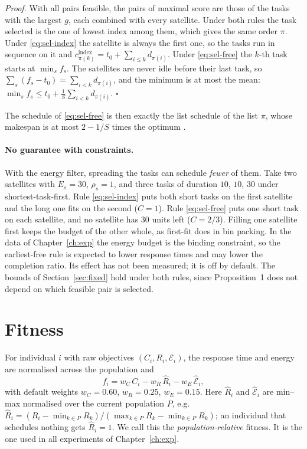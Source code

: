 \emph{Proof.} With all pairs feasible, the pairs of maximal score are those of the
tasks with the largest $g$, each combined with every satellite. Under both rules
the task selected is the one of lowest index among them, which gives the same
order $\pi$. Under \eqref{eq:sel-index} the satellite is always the first one, so
the tasks run in sequence on it and $c^{\mathrm{index}}_{\pi(k)}=t_0+\sum_{i\le k}d_{\pi(i)}$.
Under \eqref{eq:sel-free} the $k$-th task starts at $\min_s f_s$. The satellites
are never idle before their last task, so $\sum_s(f_s-t_0)=\sum_{i<k}d_{\pi(i)}$,
and the minimum is at most the mean: $\min_sf_s\le t_0+\frac1S\sum_{i<k}d_{\pi(i)}$.
\hfill$\square$

The schedule of \eqref{eq:sel-free} is then exactly the list schedule of the list
$\pi$, whose makespan is at most $2-1/S$ times the optimum
\citep{graham1966bounds}.

\paragraph{No guarantee with constraints.} With the energy filter, spreading the
tasks can schedule \emph{fewer} of them. Take two satellites with $E_s=30$,
$\rho_s=1$, and three tasks of duration $10$, $10$, $30$ under shortest-task-first.
Rule \eqref{eq:sel-index} puts both short tasks on the first satellite and the
long one fits on the second ($C=1$). Rule \eqref{eq:sel-free} puts one short task
on each satellite, and no satellite has $30$ units left ($C=2/3$). Filling one
satellite first keeps the budget of the other whole, as first-fit does in bin
packing. In the data of Chapter~\ref{ch:exp} the energy budget is the binding
constraint, so the earliest-free rule is expected to lower response times and
may lower the completion ratio. Its effect has not been measured; it is off by
default. The bounds of Section~\ref{sec:fixed} hold under both rules, since
Proposition~1 does not depend on which feasible pair is selected.

\section{Fitness}
For individual $i$ with raw objectives $(C_i, R_i, \mathcal{E}_i)$, the response
time and energy are normalised across the population and
\begin{equation}
  f_i = w_C\, C_i - w_R\, \hat R_i - w_E\, \hat{\mathcal{E}}_i ,
\end{equation}
with default weights $w_C=0.60$, $w_R=0.25$, $w_E=0.15$.
Here $\hat R_i$ and $\hat{\mathcal{E}}_i$ are min--max normalised over the current
population $P$, e.g.\ $\hat R_i = (R_i-\min_{k\in P}R_k)/(\max_{k\in P}R_k-\min_{k\in P}R_k)$;
an individual that schedules nothing gets $\hat R_i=1$. We call this the
\emph{population-relative} fitness. It is the one used in all experiments of
Chapter~\ref{ch:exp}.

